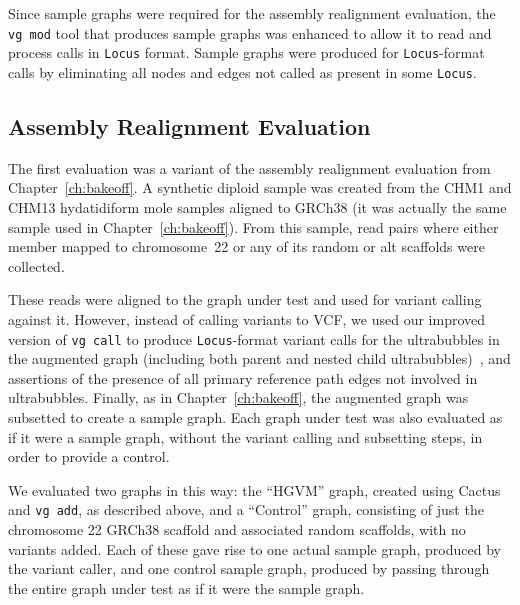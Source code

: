 Since sample graphs were required for the assembly realignment evaluation, the \texttt{vg mod} tool that produces sample graphs was enhanced to allow it to read and process calls in \texttt{Locus} format. Sample graphs were produced for \texttt{Locus}-format calls by eliminating all nodes and edges not called as present in some \texttt{Locus}.

\subsection{Assembly Realignment Evaluation}
\label{subsec:assemblyrealignmentevaluation}

The first evaluation was a variant of the assembly realignment evaluation from Chapter~\ref{ch:bakeoff}. A synthetic diploid sample was created from the CHM1 and CHM13 hydatidiform mole samples aligned to GRCh38 (it was actually the same sample used in Chapter~\ref{ch:bakeoff}). From this sample, read pairs where either member mapped to chromosome~22 or any of its random or alt scaffolds were collected. 

These reads were aligned to the graph under test and used for variant calling against it. However, instead of calling variants to VCF, we used our improved version of \texttt{vg call} to produce \texttt{Locus}-format variant calls for the ultrabubbles in the augmented graph (including both parent and nested child ultrabubbles)~\cite{paten2017superbubbles}, and assertions of the presence of all primary reference path edges not involved in ultrabubbles. Finally, as in Chapter~\ref{ch:bakeoff}, the augmented graph was subsetted to create a sample graph. Each graph under test was also evaluated as if it were a sample graph, without the variant calling and subsetting steps, in order to provide a control.

We evaluated two graphs in this way: the ``HGVM'' graph, created using Cactus and \texttt{vg add}, as described above, and a ``Control'' graph, consisting of just the chromosome 22 GRCh38 scaffold and associated random scaffolds, with no variants added. Each of these gave rise to one actual sample graph, produced by the variant caller, and one control sample graph, produced by passing through the entire graph under test as if it were the sample graph.

